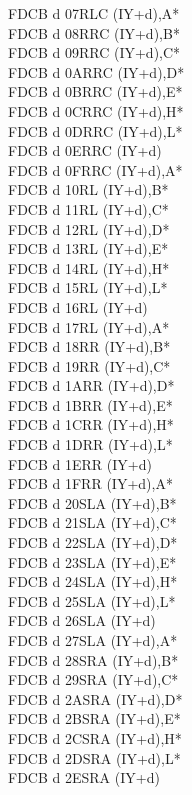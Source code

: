 \documentclass[oneside,a4paper]{book}
\begin{document}
\begin{multicols}{3}
{\begin{tabbing}
FDCB d 07\>RLC (IY+d),A*\\
FDCB d 08\>RRC (IY+d),B*\\
FDCB d 09\>RRC (IY+d),C*\\
FDCB d 0A\>RRC (IY+d),D*\\
FDCB d 0B\>RRC (IY+d),E*\\
FDCB d 0C\>RRC (IY+d),H*\\
FDCB d 0D\>RRC (IY+d),L*\\
FDCB d 0E\>RRC (IY+d)\\
FDCB d 0F\>RRC (IY+d),A*\\
FDCB d 10\>RL (IY+d),B*\\
FDCB d 11\>RL (IY+d),C*\\
FDCB d 12\>RL (IY+d),D*\\
FDCB d 13\>RL (IY+d),E*\\
FDCB d 14\>RL (IY+d),H*\\
FDCB d 15\>RL (IY+d),L*\\
FDCB d 16\>RL (IY+d)\\
FDCB d 17\>RL (IY+d),A*\\
FDCB d 18\>RR (IY+d),B*\\
FDCB d 19\>RR (IY+d),C*\\
FDCB d 1A\>RR (IY+d),D*\\
FDCB d 1B\>RR (IY+d),E*\\
FDCB d 1C\>RR (IY+d),H*\\
FDCB d 1D\>RR (IY+d),L*\\
FDCB d 1E\>RR (IY+d)\\
FDCB d 1F\>RR (IY+d),A*\\
FDCB d 20\>SLA (IY+d),B*\\
FDCB d 21\>SLA (IY+d),C*\\
FDCB d 22\>SLA (IY+d),D*\\
FDCB d 23\>SLA (IY+d),E*\\
FDCB d 24\>SLA (IY+d),H*\\
FDCB d 25\>SLA (IY+d),L*\\
FDCB d 26\>SLA (IY+d)\\
FDCB d 27\>SLA (IY+d),A*\\
FDCB d 28\>SRA (IY+d),B*\\
FDCB d 29\>SRA (IY+d),C*\\
FDCB d 2A\>SRA (IY+d),D*\\
FDCB d 2B\>SRA (IY+d),E*\\
FDCB d 2C\>SRA (IY+d),H*\\
FDCB d 2D\>SRA (IY+d),L*\\
FDCB d 2E\>SRA (IY+d)\\

\end{tabbing}}
\end{multicols}
\end{document}
